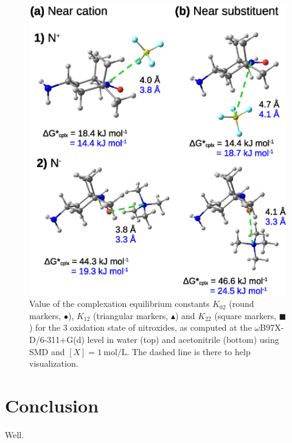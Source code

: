 \documentclass[review]{elsarticle}
\begin{document}
\begin{figure}[!h]
\centering
\includegraphics[width=\linewidth]{Figure13}
\caption{Value of the complexation equilibrium constants $K_{02}$ (round markers, $\bullet$), $K_{12}$ (triangular markers, $\blacktriangle$) and $K_{22}$ (square markers, $\blacksquare$) for the 3 oxidation state of nitroxides, as computed at the $\omega$B97X-D/6-311+G(d) level in water (top) and acetonitrile (bottom) using SMD and $[X]=\SI{1}{\mole\per\liter}$.  The dashed line is there to help visualization. }
\label{fig:Kx2}
\end{figure}

\clearpage
\section{Conclusion}

Well.
	
	
 

	
\end{document}
